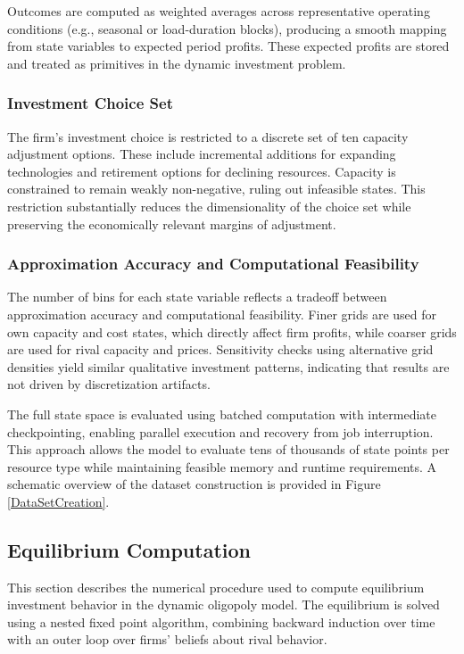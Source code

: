\documentclass[12pt]{article}
\begin{document}
Outcomes are computed as weighted averages across representative operating conditions (e.g., seasonal or load-duration blocks), producing a smooth mapping from state variables to expected period profits. These expected profits are stored and treated as primitives in the dynamic investment problem.

\subsubsection{Investment Choice Set}

The firm’s investment choice is restricted to a discrete set of ten capacity adjustment options. These include incremental additions for expanding technologies and retirement options for declining resources. Capacity is constrained to remain weakly non-negative, ruling out infeasible states. This restriction substantially reduces the dimensionality of the choice set while preserving the economically relevant margins of adjustment.

\subsubsection{Approximation Accuracy and Computational Feasibility}

The number of bins for each state variable reflects a tradeoff between approximation accuracy and computational feasibility. Finer grids are used for own capacity and cost states, which directly affect firm profits, while coarser grids are used for rival capacity and prices. Sensitivity checks using alternative grid densities yield similar qualitative investment patterns, indicating that results are not driven by discretization artifacts.

The full state space is evaluated using batched computation with intermediate checkpointing, enabling parallel execution and recovery from job interruption. This approach allows the model to evaluate tens of thousands of state points per resource type while maintaining feasible memory and runtime requirements. A schematic overview of the dataset construction is provided in Figure \ref{DataSetCreation}.

\subsection{Equilibrium Computation}\label{sec:equilibrium}

This section describes the numerical procedure used to compute equilibrium investment behavior in the dynamic oligopoly model. The equilibrium is solved using a nested fixed point algorithm, combining backward induction over time with an outer loop over firms’ beliefs about rival behavior.
\end{document}
